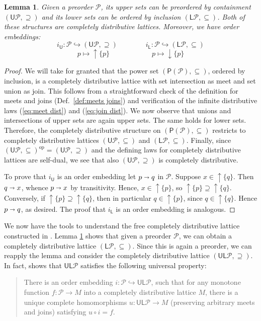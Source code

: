 \documentclass[12pt]{article}
\theoremstyle{definition}
\theoremstyle{plain}
\newtheorem{lemma}[definition]{Lemma}
\theoremstyle{plain}
\theoremstyle{plain}
\theoremstyle{plain}
\theoremstyle{remark}
\theoremstyle{remark}
\newcommand{\mc}[1]{\mathcal{#1}}
\newcommand{\sub}{\subseteq}
\newcommand{\low}{\mathsf{L}}
\newcommand{\upper}{\mathsf{U}}
\newcommand{\upc}[1]{{\uparrow #1}}
\newcommand{\lwc}[1]{{\downarrow #1}}
\begin{document}
\begin{lemma}\label{lem:upper lower lattice}
	Given a preorder $\mc{P}$, its upper sets can be preordered by containment $(\upper\mc{P}, \supseteq)$ and its lower sets can be ordered by inclusion $(\low\mc{P}, \sub)$. Both of these structures are completely distributive lattices. Moreover, we have order embeddings: 
	$$i_\mathsf{U}: \mc{P} \hookrightarrow (\upper\mc{P}, \supseteq) \qquad \qquad i_\mathsf{L}: \mc{P} \hookrightarrow (\low\mc{P}, \sub)$$
	$$ p \mapsto \upc{\{p\}} \qquad \qquad \qquad p \mapsto \lwc{\{p\}}$$
\end{lemma}
\begin{proof}
	We will take for granted that the power set $(\mathsf{P}(\mc{P}),\sub)$, ordered by inclusion, is a completely distributive lattice with set intersection as meet and set union as join. This follows from a straightforward check of the definition for meets and joins (Def.~\ref{def:meets joins}) and verification of the infinite distributive laws (\ref{eq:meet dist}) and (\ref{eq:join dist}). We now observe that unions and intersections of upper sets are again upper sets. The same holds for lower sets. Therefore, the completely distributive structure on $(\mathsf{P}(\mc{P}),\sub)$ restricts to completely distributive lattices $(\upper\mc{P}, \sub)$ and $(\low\mc{P}, \sub)$. Finally, since $(\upper\mc{P}, \sub)^\text{op} = (\upper\mc{P}, \supseteq)$ and the defining laws for completely distributive lattices are self-dual, we see that also $(\upper\mc{P}, \supseteq)$ is completely distributive.
	
	To prove that $i_\mathsf{U}$ is an order embedding let $p \shortrightarrow q$ in $\mc{P}$. Suppose $x \in \upc{\{q\}}$. Then $q \shortrightarrow x$, whence $p \shortrightarrow x$ by transitivity. Hence, $x \in \upc{\{p\}}$, so $\upc{\{p\}} \supseteq \upc{\{q\}}$. Conversely, if $\upc{\{p\}} \supseteq \upc{\{q\}}$, then in particular $q \in \upc{\{p\}}$, since $q \in \upc{\{q\}}$. Hence $p \shortrightarrow q$, as desired. The proof that $i_\mathsf{L}$ is an order embedding is analogous.
\end{proof}

We now have the tools to understand the free completely distributive lattice constructed in \cite{Morris2004}. Lemma \ref{lem:upper lower lattice} shows that given a preorder $\mc{P}$, we can obtain a completely distributive lattice $(\low\mc{P}, \sub)$. Since this is again a preorder, we can reapply the lemma and consider the completely distributive lattice $(\upper\low\mc{P}, \supseteq)$. In fact, \cite{Morris2004} shows that $\upper\low\mc{P}$ satisfies the following universal property:
\begin{quote}
	There is an order embedding $i: \mc{P} \hookrightarrow \upper\low\mc{P}$, such that for any monotone function $f: \mc{P} \rightarrow M$ into a completely distributive lattice $M$, there is a unique complete homomorphisms $u: \upper\low\mc{P} \rightarrow M$ (preserving arbitrary meets and joins) satisfying $u \circ i = f$.
\end{quote}
\end{document}
